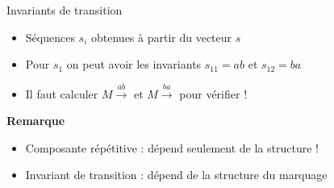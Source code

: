 \documentclass[compress]{beamer}
\begin{document}
\begin{frame}{Invariants de transition}
\begin{itemize}
\item Séquences $s_i$ obtenues à partir du vecteur $s$
\item Pour $s_1$ on peut avoir les invariants $s_{11} = ab$ et $s_{12} = ba$
\item Il faut calculer $M \stackrel{ab}{\longrightarrow}$ et $M \stackrel{ba}{\longrightarrow}$ pour vérifier !
\end{itemize}  
{\bf Remarque} 
\begin{itemize}
\item Composante répétitive : dépend seulement de la structure !
\item Invariant de transition : dépend de la structure  du  marquage
\end{itemize}
\end{frame}

\end{document}
